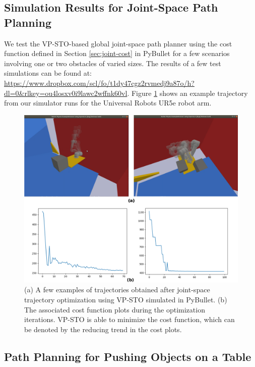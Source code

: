 \subsection{Simulation Results for Joint-Space Path Planning}

We test the VP-STO-based global joint-space path planner using the cost function defined in Section \ref{sec:joint-cost} in PyBullet for a few scenarios involving one or two obstacles of varied sizes. The results of a few test simulations can be found at: \url{https://www.dropbox.com/scl/fo/t1dy47cgz2rvmedj9a87o/h?dl=0&rlkey=ou4losxv0i9lawc2wffnk60vl}. Figure \ref{fig:joint_traj_ur5} shows an example trajectory from our simulator runs for the Universal Robots UR5e robot arm. 

\begin{figure}[ht]
    \centering
    \includegraphics[scale=0.2]{figures/bl-manipulator/joint_trajs.png}
    \caption[Joint-space trajectories using VP-STO]{(a) A few examples of trajectories obtained after joint-space trajectory optimization using VP-STO simulated in PyBullet. (b) The associated cost function plots during the optimization iterations. VP-STO is able to minimize the cost function, which can be denoted by the reducing trend in the cost plots.}
    \label{fig:joint_traj_ur5}
\end{figure}

\subsection{Path Planning for Pushing Objects on a Table}

